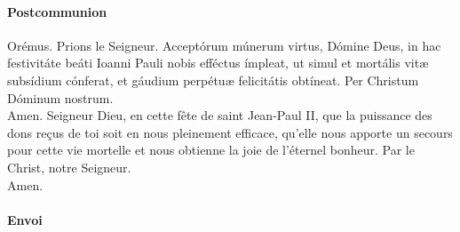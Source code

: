 \documentclass[twoside]{article}
\begin{document}
\paragraph{Postcommunion}
\begin{paracol}{2}
\vv Orémus.
\switchcolumn
\vv Prions le Seigneur.
\switchcolumn*
Acceptórum múnerum virtus, Dómine Deus,
in hac festivitáte beáti Ioanni Pauli nobis efféctus ímpleat,
ut simul et mortális vitæ subsídium cónferat,
et gáudium perpétuæ felicitátis obtíneat.
Per Christum Dóminum nostrum.\\
\rr Amen.
\switchcolumn
Seigneur Dieu, en cette fête de saint Jean-Paul II, que la puissance des dons reçus de toi
soit en nous pleinement efficace,
qu'elle nous apporte un secours pour cette vie mortelle
et nous obtienne la joie de l'éternel bonheur.
Par le Christ, notre Seigneur. \\
\rr Amen.
\end{paracol}

\paragraph{Envoi}


\begin{paracol}{2}
\end{paracol}
\end{document}
